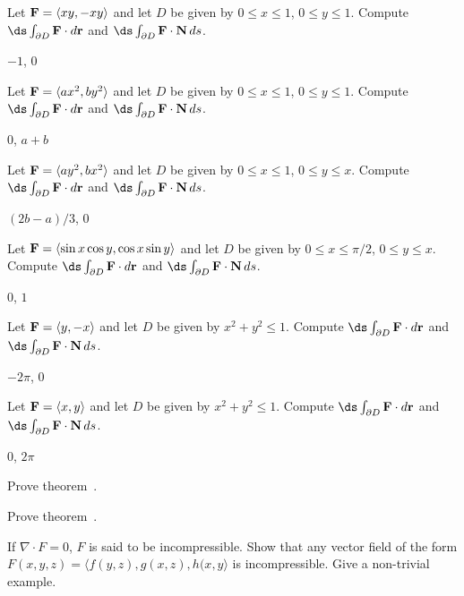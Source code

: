 \begin{exercises}

\exercise Let ${\bf F}=\langle xy,-xy\rangle$ and 
let $D$ be given by $0\le x\le 1$, $0\le y\le 1$.
Compute $\ds\int_{\partial D} {\bf F}\cdot d{\bf r}$ and
$\ds\int_{\partial D} {\bf F}\cdot{\bf N}\,ds$.
\begin{answer} $-1$, $0$
\end{answer}

\exercise Let ${\bf F}=\langle ax^2,by^2\rangle$ and 
let $D$ be given by $0\le x\le 1$, $0\le y\le 1$.
Compute $\ds\int_{\partial D} {\bf F}\cdot d{\bf r}$ and
$\ds\int_{\partial D} {\bf F}\cdot{\bf N}\,ds$.
\begin{answer} $0$, $a+b$
\end{answer}

\exercise Let ${\bf F}=\langle ay^2,bx^2\rangle$ and 
let $D$ be given by $0\le x\le 1$, $0\le y\le x$.
Compute $\ds\int_{\partial D} {\bf F}\cdot d{\bf r}$ and
$\ds\int_{\partial D} {\bf F}\cdot{\bf N}\,ds$.
\begin{answer} $(2b-a)/3$, $0$
\end{answer}

\exercise Let ${\bf F}=\langle \sin x\cos y,\cos x\sin y\rangle$ and 
let $D$ be given by $0\le x\le \pi/2$, $0\le y\le x$.
Compute $\ds\int_{\partial D} {\bf F}\cdot d{\bf r}$ and
$\ds\int_{\partial D} {\bf F}\cdot{\bf N}\,ds$.
\begin{answer} $0$, $1$
\end{answer}

\exercise Let ${\bf F}=\langle y,-x\rangle$ and 
let $D$ be given by $x^2+y^2\le 1$.
Compute $\ds\int_{\partial D} {\bf F}\cdot d{\bf r}$ and
$\ds\int_{\partial D} {\bf F}\cdot{\bf N}\,ds$.
\begin{answer} $-2\pi$, $0$
\end{answer}

\exercise Let ${\bf F}=\langle x,y\rangle$ and 
let $D$ be given by $x^2+y^2\le 1$.
Compute $\ds\int_{\partial D} {\bf F}\cdot d{\bf r}$ and
$\ds\int_{\partial D} {\bf F}\cdot{\bf N}\,ds$.
\begin{answer} $0$, $2\pi$
\end{answer}

\exercise Prove theorem~.

\exercise Prove theorem~.

\exercise If $\nabla \cdot F=0$, $F$ is said to be {\dfont
incompressible}.  Show that any vector field
of the form $F(x,y,z) = \langle f(y,z),g(x,z),h(x,y\rangle$ is
incompressible.  Give a non-trivial example.

\end{exercises}


